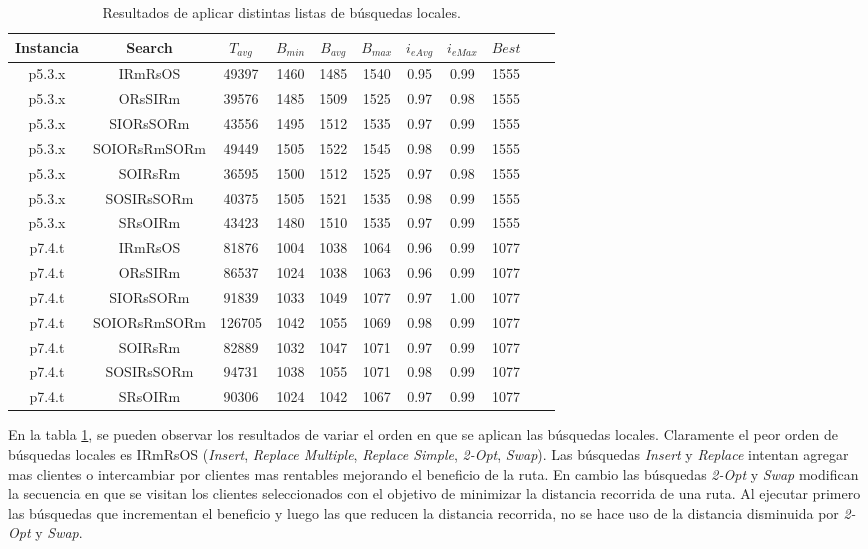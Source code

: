 \bigskip

\begin{table}
\begin{center}
\begin{tabular}{ |c|c|c|c|c|c|c|c|c|c|c| } 
\hline
Instancia & Search & $T_{avg}$ & $B_{min}$ & $B_{avg}$ & $B_{max}$ & $i_{eAvg}$ & $i_{eMax}$ & $Best$ \\
\hline
p5.3.x & IRmRsOS & 49397 & 1460 & 1485 & 1540 & 0.95 & 0.99 & 1555  \\
p5.3.x & ORsSIRm & 39576 & 1485 & 1509 & 1525 & 0.97 & 0.98 & 1555  \\
p5.3.x & SIORsSORm & 43556 & 1495 & 1512 & 1535 & 0.97 & 0.99 & 1555  \\
p5.3.x & SOIORsRmSORm & 49449 & 1505 & 1522 & 1545 & 0.98 & 0.99 & 1555  \\
p5.3.x & SOIRsRm & 36595 & 1500 & 1512 & 1525 & 0.97 & 0.98 & 1555  \\
p5.3.x & SOSIRsSORm & 40375 & 1505 & 1521 & 1535 & 0.98 & 0.99 & 1555  \\
p5.3.x & SRsOIRm & 43423 & 1480 & 1510 & 1535 & 0.97 & 0.99 & 1555  \\
p7.4.t & IRmRsOS & 81876 & 1004 & 1038 & 1064 & 0.96 & 0.99 & 1077  \\
p7.4.t & ORsSIRm & 86537 & 1024 & 1038 & 1063 & 0.96 & 0.99 & 1077  \\
p7.4.t & SIORsSORm & 91839 & 1033 & 1049 & 1077 & 0.97 & 1.00 & 1077  \\
p7.4.t & SOIORsRmSORm & 126705 & 1042 & 1055 & 1069 & 0.98 & 0.99 & 1077  \\
p7.4.t & SOIRsRm & 82889 & 1032 & 1047 & 1071 & 0.97 & 0.99 & 1077  \\
p7.4.t & SOSIRsSORm & 94731 & 1038 & 1055 & 1071 & 0.98 & 0.99 & 1077  \\
p7.4.t & SRsOIRm & 90306 & 1024 & 1042 & 1067 & 0.97 & 0.99 & 1077  \\
\hline
\end{tabular}
\end{center}
\caption{Resultados de aplicar distintas listas de búsquedas locales.}
\label{tab:resultadosListaLS}
\end{table}

\bigskip

En la tabla \ref{tab:resultadosListaLS}, se pueden observar los resultados de variar el orden en que se aplican las búsquedas locales. Claramente el peor orden de búsquedas locales es IRmRsOS (\textit{Insert}, \textit{Replace Multiple}, \textit{Replace Simple}, \textit{2-Opt}, \textit{Swap}). Las búsquedas \textit{Insert} y \textit{Replace} intentan agregar mas clientes o intercambiar por clientes mas rentables mejorando el beneficio de la ruta. En cambio las búsquedas \textit{2-Opt} y \textit{Swap} modifican la secuencia en que se visitan los clientes seleccionados con el objetivo de minimizar la distancia recorrida de una ruta. Al ejecutar primero las búsquedas que incrementan el beneficio y luego las que reducen la distancia recorrida, no se hace uso de la distancia disminuida por \textit{2-Opt} y \textit{Swap}.

